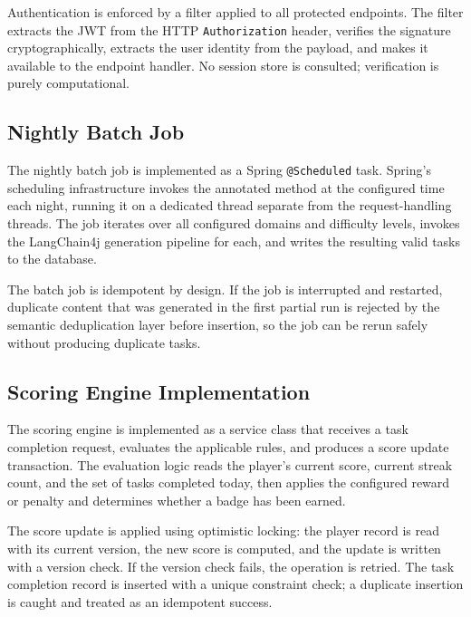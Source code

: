 Authentication is enforced by a filter applied to all protected endpoints. The filter extracts the JWT from the HTTP \texttt{Authorization} header, verifies the signature cryptographically, extracts the user identity from the payload, and makes it available to the endpoint handler. No session store is consulted; verification is purely computational.


\subsection{Nightly Batch Job}

The nightly batch job is implemented as a Spring \texttt{@Scheduled} task. Spring's scheduling infrastructure invokes the annotated method at the configured time each night, running it on a dedicated thread separate from the request-handling threads. The job iterates over all configured domains and difficulty levels, invokes the LangChain4j generation pipeline for each, and writes the resulting valid tasks to the database.

The batch job is idempotent by design. If the job is interrupted and restarted, duplicate content that was generated in the first partial run is rejected by the semantic deduplication layer before insertion, so the job can be rerun safely without producing duplicate tasks.


\subsection{Scoring Engine Implementation}

The scoring engine is implemented as a service class that receives a task completion request, evaluates the applicable rules, and produces a score update transaction. The evaluation logic reads the player's current score, current streak count, and the set of tasks completed today, then applies the configured reward or penalty and determines whether a badge has been earned.

The score update is applied using optimistic locking: the player record is read with its current version, the new score is computed, and the update is written with a version check. If the version check fails, the operation is retried. The task completion record is inserted with a unique constraint check; a duplicate insertion is caught and treated as an idempotent success.

